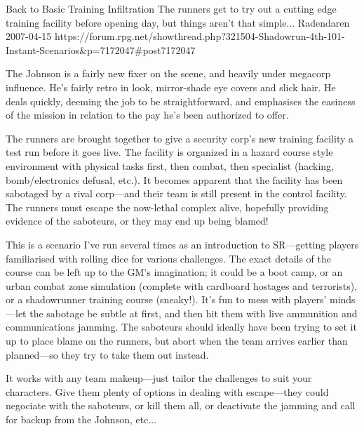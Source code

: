 \begin{scenario}{Back to Basic Training}
	{Infiltration}
	{The runners get to try out a cutting edge training facility before opening day, but things aren't that simple...}
	{Radendaren}
	{2007-04-15}
	{https://forum.rpg.net/showthread.php?321504-Shadowrun-4th-101-Instant-Scenarios\&p=7172047#post7172047}

 The Johnson is a fairly new fixer on the scene, and heavily under megacorp influence. He's fairly retro in look, mirror-shade eye covers and slick hair. He deals quickly, deeming the job to be straightforward, and emphasises the easiness of the mission in relation to the pay he's been authorized to offer.

\synopsis The runners are brought together to give a security corp's new training facility a test run before it goes live. The facility is organized in a hazard course style environment with physical tasks first, then combat, then specialist (hacking, bomb/electronics defusal, etc.). It becomes apparent that the facility has been sabotaged by a rival corp---and their team is still present in the control facility. The runners must escape the now-lethal complex alive, hopefully providing evidence of the saboteurs, or they may end up being blamed!

\notes This is a scenario I've run several times as an introduction to SR---getting players familiarised with rolling dice for various challenges. The exact details of the course can be left up to the GM's imagination; it could be a boot camp, or an urban combat zone simulation (complete with cardboard hostages and terrorists), or a shadowrunner training course (sneaky!). It's fun to mess with players' minds---let the sabotage be subtle at first, and then hit them with live ammunition and communications jamming. The saboteurs should ideally have been trying to set it up to place blame on the runners, but abort when the team arrives earlier than planned---so they try to take them out instead.

It works with any team makeup---just tailor the challenges to suit your characters. Give them plenty of options in dealing with escape---they could negociate with the saboteurs, or kill them all, or deactivate the jamming and call for backup from the Johnson, etc... 

\end{scenario}